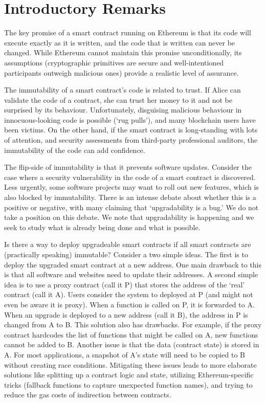 

\section{Introductory Remarks}

The key promise of a smart contract running on Ethereum is that its code will execute exactly as it is written, and the code that is written can never be changed. While Ethereum cannot maintain this promise unconditionally, its assumptions (\eg cryptographic primitives are secure and well-intentioned participants outweigh malicious ones) provide a realistic level of assurance. 

The immutability of a smart contract's code is related to trust. If Alice can validate the code of a contract, she can trust her money to it and not be surprised by its behaviour. Unfortunately, disguising malicious behaviour in innocuous-looking code is possible (`rug pulls'), and many blockchain users have been victims. On the other hand, if the smart contract is long-standing with lots of attention, and security assessments from third-party professional auditors, the immutability of the code can add confidence. 

The flip-side of immutability is that it prevents software updates. Consider the case where a security vulnerability in the code of a smart contract is discovered. Less urgently, some software projects may want to roll out new features, which is also blocked by immutability. There is an intense debate about whether this is a positive or negative, with many claiming that `upgradability is a bug.' We do not take a position on this debate. We note that upgradability is happening and we seek to study what is already being done and what is possible. 

Is there a way to deploy upgradeable smart contracts if all smart contracts are (practically speaking) immutable? Consider a two simple ideas. The first is to deploy the upgraded smart contract at a new address. One main drawback to this is that all software and websites need to update their addresses. A second simple idea is to use a proxy contract (call it P) that stores the address of the `real' contract (call it A). Users consider the system to deployed at P (and might not even be aware it is proxy). When a function is called on P, it is forwarded to A. When an upgrade is deployed to a new address (call it B), the address in P is changed from A to B. This solution also has drawbacks. For example, if the proxy contract hardcodes the list of functions that might be called on A, new functions cannot be added to B. Another issue is that the data (contract state) is stored in A. For most applications, a snapshot of A's state will need to be copied to B without creating race conditions. Mitigating these issues leads to more elaborate solutions like splitting up a contract logic and state, utilizing Ethereum-specific tricks (fallback functions to capture unexpected function names), and trying to reduce the gas costs of indirection between contracts.

